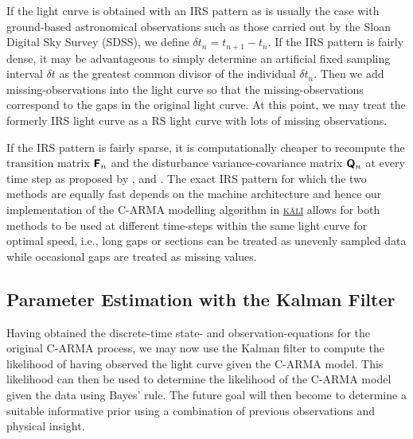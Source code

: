 \documentclass[a4paper,fleqn,usenatbib]{mnras}
\begin{document}
If the light curve is obtained with an IRS pattern as is usually the case with ground-based astronomical observations such as those carried out by the Sloan Digital Sky Survey (SDSS), we define $\delta t_{n} = t_{n+1} - t_{n}$. If the IRS pattern is fairly dense, it may be advantageous to simply determine an artificial fixed sampling interval $\delta t$ as the greatest common divisor of the individual $\delta t_{n}$. Then we add missing-observations into the light curve so that the missing-observations correspond to the gaps in the original light curve. At this point, we may treat the formerly IRS light curve as a RS light curve with lots of missing observations.

If the IRS pattern is fairly sparse, it is computationally cheaper to recompute the transition matrix $\textbf{\textsf{F}}_{n}$ and the disturbance variance-covariance matrix $\textbf{\textsf{Q}}_{n}$ at every time step as proposed by \cite{JonesAckerson90}, \cite{Jones} and \cite{Kelly14}. The exact IRS pattern for which the two methods are equally fast depends on the machine architecture and hence our implementation of the C-ARMA modelling algorithm in \href{https://github.com/AstroVPK/kali}{\textsc{k\={a}l\={i}}} allows for both methods to be used at different time-steps within the same light curve for optimal speed, i.e., long gaps or sections can be treated as unevenly sampled data while occasional gaps are treated as missing values.

\subsection[Parameter Estimation]{Parameter Estimation with the Kalman Filter}\label{sec:Kalman}

Having obtained the discrete-time state- and observation-equations for the original C-ARMA process, we may now use the Kalman filter to compute the likelihood of having observed the light curve given the C-ARMA model. This likelihood can then be used to determine the likelihood of the C-ARMA model given the data using Bayes' rule. The future goal will then become to determine a suitable informative prior using a combination of previous observations and physical insight.
\end{document}
